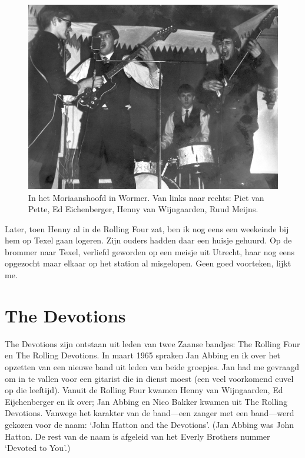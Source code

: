 \documentclass[12pt,twoside, openright]{memoir}
\begin{document}
\begin{figure}
\centering
\includegraphics[width=\textwidth]{img/147-MoriaanA}
\caption*{\footnotesize In het Moriaanshoofd in Wormer. Van links naar rechts: Piet van Pette, Ed Eichenberger, Henny van Wijngaarden, Ruud Meijns.}
\end{figure}

Later, toen Henny al in de Rolling Four zat, ben ik nog eens een weekeinde bij hem op Texel gaan logeren. Zijn ouders hadden daar een huisje gehuurd. Op de brommer naar Texel, verliefd geworden op een meisje uit Utrecht, haar nog eens opgezocht maar elkaar op het station al misgelopen. Geen goed voorteken, lijkt me.

\section*{The Devotions} %
\label{cha:devotions}

The Devotions zijn ontstaan uit leden van twee Zaanse bandjes: The Rolling Four en The Rolling Devotions. In maart 1965 spraken Jan Abbing en ik over het opzetten van een nieuwe band uit leden van beide groepjes. Jan had me gevraagd om in te vallen voor een gitarist die in dienst moest (een veel voorkomend euvel op die leeftijd). Vanuit de Rolling Four kwamen Henny van Wijngaarden, Ed Eijchenberger en ik over; Jan Abbing en Nico Bakker kwamen uit The Rolling Devotions. Vanwege het karakter van de band---een zanger met een band---werd gekozen voor de naam: `John Hatton and the Devotions'. (Jan Abbing was John Hatton. De rest van de naam is afgeleid van het Everly Brothers nummer `Devoted to You'.)
\end{document}
